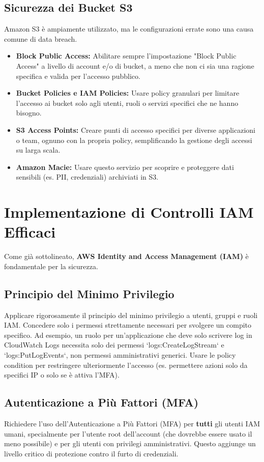 \documentclass[a4paper,12pt]{report}
\begin{document}
\subsection{Sicurezza dei Bucket S3}
\label{subsec:s3-security}
Amazon S3 è ampiamente utilizzato, ma le configurazioni errate sono una causa comune di data breach.
\begin{itemize}
    \item \textbf{Block Public Access:} Abilitare sempre l'impostazione "Block Public Access" a livello di account e/o di bucket, a meno che non ci sia una ragione specifica e valida per l'accesso pubblico.
    \item \textbf{Bucket Policies e IAM Policies:} Usare policy granulari per limitare l'accesso ai bucket solo agli utenti, ruoli o servizi specifici che ne hanno bisogno.
    \item \textbf{S3 Access Points:} Creare punti di accesso specifici per diverse applicazioni o team, ognuno con la propria policy, semplificando la gestione degli accessi su larga scala.
    \item \textbf{Amazon Macie:} Usare questo servizio per scoprire e proteggere dati sensibili (es. PII, credenziali) archiviati in S3.
\end{itemize}

\section{Implementazione di Controlli IAM Efficaci}
\label{sec:iam-implementation}
Come già sottolineato, \textbf{AWS Identity and Access Management (IAM)} è fondamentale per la sicurezza.

\subsection{Principio del Minimo Privilegio}
\label{subsec:least-privilege-impl}
Applicare rigorosamente il principio del minimo privilegio a utenti, gruppi e ruoli IAM. Concedere solo i permessi strettamente necessari per svolgere un compito specifico. Ad esempio, un ruolo per un'applicazione che deve solo scrivere log in CloudWatch Logs necessita solo dei permessi `logs:CreateLogStream` e `logs:PutLogEvents`, non permessi amministrativi generici. Usare le policy condition per restringere ulteriormente l'accesso (es. permettere azioni solo da specifici IP o solo se è attiva l'MFA).

\subsection{Autenticazione a Più Fattori (MFA)}
\label{subsec:mfa-impl}
Richiedere l'uso dell'Autenticazione a Più Fattori (MFA) per \textbf{tutti} gli utenti IAM umani, specialmente per l'utente root dell'account (che dovrebbe essere usato il meno possibile) e per gli utenti con privilegi amministrativi. Questo aggiunge un livello critico di protezione contro il furto di credenziali.
\end{document}
